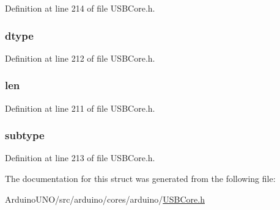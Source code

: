 Definition at line 214 of file U\+S\+B\+Core.\+h.

\hypertarget{struct_c_d_c_c_s_interface_descriptor4_a0bb419531ec75697e63e9109fecf81b0}{}
\subsubsection[{dtype}]{ dtype}\label{struct_c_d_c_c_s_interface_descriptor4_a0bb419531ec75697e63e9109fecf81b0}


Definition at line 212 of file U\+S\+B\+Core.\+h.

\hypertarget{struct_c_d_c_c_s_interface_descriptor4_afbf3f3230446569534d5f466aaf4c23b}{}
\subsubsection[{len}]{ len}\label{struct_c_d_c_c_s_interface_descriptor4_afbf3f3230446569534d5f466aaf4c23b}


Definition at line 211 of file U\+S\+B\+Core.\+h.

\hypertarget{struct_c_d_c_c_s_interface_descriptor4_afb82dd1313bc5284e4e5aef8218ef414}{}
\subsubsection[{subtype}]{ subtype}\label{struct_c_d_c_c_s_interface_descriptor4_afb82dd1313bc5284e4e5aef8218ef414}


Definition at line 213 of file U\+S\+B\+Core.\+h.



The documentation for this struct was generated from the following file\+:\begin{DoxyCompactItemize}
\item 
Arduino\+U\+N\+O/src/arduino/cores/arduino/\hyperlink{_u_s_b_core_8h}{U\+S\+B\+Core.\+h}\end{DoxyCompactItemize}
